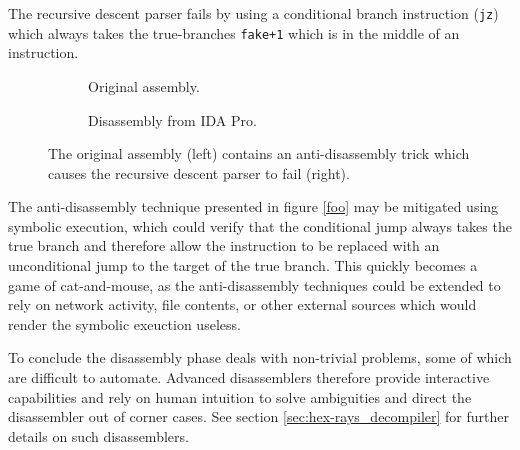 The recursive descent parser fails by using a conditional branch instruction (\texttt{jz}) which always takes the true-branches \texttt{fake+1} which is in the middle of an instruction.

\begin{figure}[htbp]
	\centering
	\begin{subfigure}[t]{0.59\textwidth}
		
		\caption{Original assembly.}
	\end{subfigure}
	\qquad
	\begin{subfigure}[t]{0.34\textwidth}
		
		\caption{Disassembly from IDA Pro.}
	\end{subfigure}
	\caption{The original assembly (left) contains an anti-disassembly trick which causes the recursive descent parser to fail (right).}
	\label{fig:anti-disassembly}
\end{figure}

The anti-disassembly technique presented in figure \ref{foo} may be mitigated using symbolic execution, which could verify that the conditional jump always takes the true branch and therefore allow the instruction to be replaced with an unconditional jump to the target of the true branch. This quickly becomes a game of cat-and-mouse, as the anti-disassembly techniques could be extended to rely on network activity, file contents, or other external sources which would render the symbolic exeuction useless.

To conclude the disassembly phase deals with non-trivial problems, some of which are difficult to automate. Advanced disassemblers therefore provide interactive capabilities and rely on human intuition to solve ambiguities and direct the disassembler out of corner cases. See section \ref{sec:hex-rays_decompiler} for further details on such disassemblers.

%
%
%
